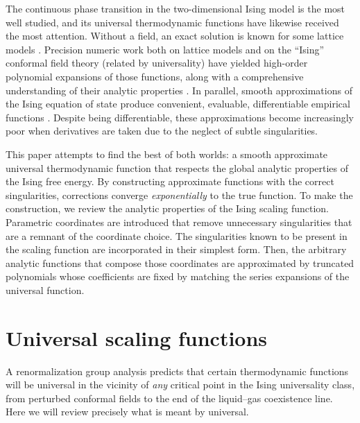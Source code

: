 \documentclass[
aps,
pre,
preprint,
longbibliography,
floatfix
]{revtex4-2}
\begin{document}
The continuous phase transition in the two-dimensional Ising model is the most
well studied, and its universal thermodynamic functions have likewise received
the most attention. Without a field, an exact solution is known for some
lattice models \cite{Onsager_1944_Crystal}. Precision numeric work both on
lattice models and on the ``Ising'' conformal field theory (related by
universality) have yielded high-order polynomial expansions of those functions,
along with a comprehensive understanding of their analytic properties
\cite{Fonseca_2003_Ising, Mangazeev_2008_Variational, Mangazeev_2010_Scaling}.
In parallel, smooth approximations of the Ising equation of state produce
convenient, evaluable, differentiable empirical functions
\cite{Caselle_2001_The}. Despite being differentiable, these approximations
become increasingly poor when derivatives are taken due to the neglect of
subtle singularities.

This paper attempts to find the best of both worlds: a smooth approximate
universal thermodynamic function that respects the global analytic properties
of the Ising free energy. By constructing approximate functions with the
correct singularities, corrections converge \emph{exponentially} to the true
function.  To make the construction, we review the analytic properties of the
Ising scaling function. Parametric coordinates are introduced that remove
unnecessary singularities that are a remnant of the coordinate choice. The
singularities known to be present in the scaling function are incorporated in
their simplest form. Then, the arbitrary analytic functions that compose those
coordinates are approximated by truncated polynomials whose coefficients are
fixed by matching the series expansions of the universal function.

\section{Universal scaling functions}

A renormalization group analysis predicts that certain thermodynamic functions
will be universal in the vicinity of \emph{any} critical point in the Ising
universality class, from perturbed conformal fields to the end of the
liquid--gas coexistence line. Here we will review precisely what is meant by
universal.
\end{document}
